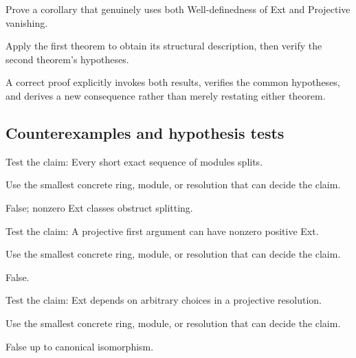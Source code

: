 \begin{exercise}\label{exr:v27-expand-09}
Prove a corollary that genuinely uses both Well-definedness of Ext and Projective vanishing.
\end{exercise}
\begin{hint}
Apply the first theorem to obtain its structural description, then verify the second theorem's hypotheses.
\end{hint}
\begin{solution}
A correct proof explicitly invokes both results, verifies the common hypotheses, and derives a new consequence rather than merely restating either theorem.
\end{solution}

\subsection*{Counterexamples and hypothesis tests}

\begin{exercise}\label{exr:v27-expand-10}
Test the claim: Every short exact sequence of modules splits.
\end{exercise}
\begin{hint}
Use the smallest concrete ring, module, or resolution that can decide the claim.
\end{hint}
\begin{solution}
False; nonzero Ext classes obstruct splitting.
\end{solution}

\begin{exercise}\label{exr:v27-expand-11}
Test the claim: A projective first argument can have nonzero positive Ext.
\end{exercise}
\begin{hint}
Use the smallest concrete ring, module, or resolution that can decide the claim.
\end{hint}
\begin{solution}
False.
\end{solution}

\begin{exercise}\label{exr:v27-expand-12}
Test the claim: Ext depends on arbitrary choices in a projective resolution.
\end{exercise}
\begin{hint}
Use the smallest concrete ring, module, or resolution that can decide the claim.
\end{hint}
\begin{solution}
False up to canonical isomorphism.
\end{solution}

